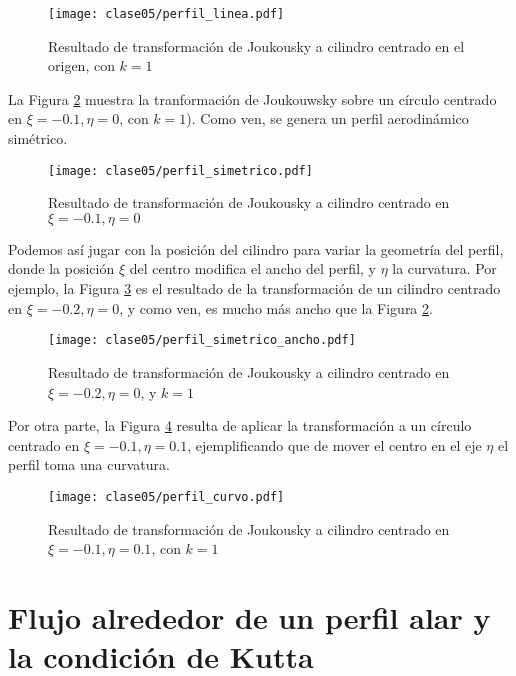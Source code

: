 \begin{figure}[h!]
\centering
\texttt{[image: clase05/perfil\_linea.pdf]}
\caption{Resultado de transformación de Joukousky a cilindro centrado en el origen, con $k=1$}\label{fig:perfil_linea}
\end{figure}


La Figura \ref{fig:perfil_simetrico} muestra la tranformación de Joukouwsky sobre un círculo centrado en $\xi=-0.1, \eta=0$, con $k=1$).
Como ven, se genera un perfil aerodinámico simétrico.
%
\begin{figure}[h!]
\centering
\texttt{[image: clase05/perfil\_simetrico.pdf]}
\caption{Resultado de transformación de Joukousky a cilindro centrado en $\xi=-0.1, \eta=0$}\label{fig:perfil_simetrico}
\end{figure}
%
Podemos así jugar con la posición del cilindro para variar la geometría del perfil, donde la posición $\xi$ del centro modifica el ancho del perfil, y $\eta$ la curvatura.
Por ejemplo, la Figura \ref{fig:perfil_simetrico_ancho} es el resultado de la transformación de un cilindro centrado en $\xi=-0.2, \eta=0$, y como ven, es mucho más ancho que la Figura \ref{fig:perfil_simetrico}.
%
\begin{figure}[h!]
\centering
\texttt{[image: clase05/perfil\_simetrico\_ancho.pdf]}
\caption{Resultado de transformación de Joukousky a cilindro centrado en $\xi=-0.2, \eta=0$, y $k=1$}\label{fig:perfil_simetrico_ancho}
\end{figure}

Por otra parte, la Figura \ref{fig:perfil_curvo} resulta de aplicar la transformación a un círculo centrado en $\xi=-0.1, \eta=0.1$, ejemplificando que de mover el centro en el eje $\eta$ el perfil toma una curvatura.
%
\begin{figure}[h!]
\centering
\texttt{[image: clase05/perfil\_curvo.pdf]}
\caption{Resultado de transformación de Joukousky a cilindro centrado en $\xi=-0.1, \eta=0.1$, con $k=1$}\label{fig:perfil_curvo}
\end{figure}

\section*{Flujo alrededor de un perfil alar y la condición de Kutta}

